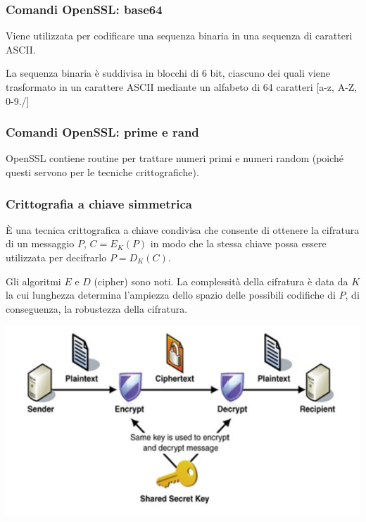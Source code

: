         \subsubsection{Comandi OpenSSL: base64}
            Viene utilizzata per codificare una sequenza binaria in una sequenza di caratteri ASCII.
        
            La sequenza binaria è suddivisa in blocchi di 6 bit, ciascuno dei quali viene trasformato in un carattere ASCII mediante un alfabeto di 64 caratteri [a-z, A-Z, 0-9./]

            

        \subsubsection{Comandi OpenSSL: prime e rand}
            OpenSSL contiene routine per trattare numeri primi e numeri random (poiché questi servono per le tecniche crittografiche).

            

        \subsubsection{Crittografia a chiave simmetrica}
            È una tecnica crittografica a chiave condivisa che consente di ottenere la cifratura di un messaggio $P$, $C = E_K (P)$ in modo che la stessa chiave possa essere utilizzata per decifrarlo $P = D_K(C)$.

            Gli algoritmi $E$ e $D$ (cipher) sono noti. La complessità della cifratura è data da $K$ la cui lunghezza determina l'ampiezza dello spazio delle possibili codifiche di $P$, di conseguenza, la robustezza della cifratura.

            \begin{center}
                \includegraphics[scale=0.5]{chapters/7/assets/schema_k.png}
            \end{center}

